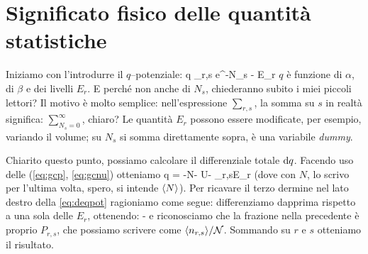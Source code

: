 \section{Significato fisico delle quantità statistiche}

Iniziamo con l'introdurre il $q$--potenziale:
\be
q \equiv \ln\sum_{r,s} e^{-\alpha N_s - \beta E_r}
\ee
$q$ è funzione di $\alpha$, di $\beta$ e dei livelli $E_r$. E perché non anche di $N_s$, chiederanno subito i miei piccoli lettori? Il motivo è molto semplice: nell'espressione $\sum_{r,s}$, la somma su $s$ in realtà significa: $\sum_{N_s=0}^\infty$, chiaro? Le quantità $E_r$ possono essere modificate, per esempio, variando il volume; su $N_s$ si somma direttamente sopra, è una variabile {\em dummy}.

Chiarito questo punto, possiamo calcolare il differenziale totale ${\textrm d}q$. Facendo uso delle (\ref{eq:gcp}, \ref{eq:gcnu}) otteniamo
\be
\label{eq:deqpot}
\de q = -N\de\alpha - U\de\beta - \frac{\beta}{\calN}\sum_{r,s}\aspetta{\nrs}\de E_r
\ee
(dove con $N$, lo scrivo per l'ultima volta, spero, si intende $\langle N\rangle$). 
Per ricavare il terzo dermine nel lato destro della \ref{eq:deqpot} ragioniamo come segue: differenziamo dapprima rispetto a una sola delle $E_r$, ottenendo:
\be
-\beta {}
\ee
e riconosciamo che la frazione nella precedente è proprio $P_{r,s}$, che possiamo scrivere come $\langle n_{r,s}\rangle/{\mathcal N}$. Sommando su $r$ e $s$ otteniamo il risultato.

